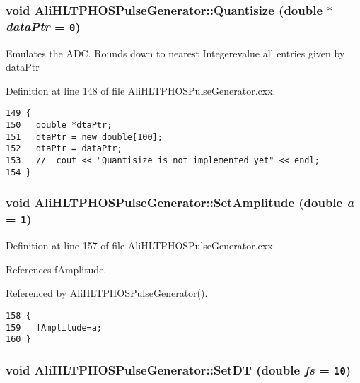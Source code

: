 \subsubsection{\setlength{\rightskip}{0pt plus 5cm}void Ali\-HLTPHOSPulse\-Generator::Quantisize (double $\ast$ {\em data\-Ptr} = {\tt 0})}\label{classAliHLTPHOSPulseGenerator_a11}


Emulates the ADC. Rounds down to nearest Integerevalue all entries given by data\-Ptr 

Definition at line 148 of file Ali\-HLTPHOSPulse\-Generator.cxx.

\footnotesize\begin{verbatim}149 {
150   double *dtaPtr;
151   dtaPtr = new double[100];
152   dtaPtr = dataPtr;
153   //  cout << "Quantisize is not implemented yet" << endl;
154 }
\end{verbatim}\normalsize 


\subsubsection{\setlength{\rightskip}{0pt plus 5cm}void Ali\-HLTPHOSPulse\-Generator::Set\-Amplitude (double {\em a} = {\tt 1})}\label{classAliHLTPHOSPulseGenerator_a12}




Definition at line 157 of file Ali\-HLTPHOSPulse\-Generator.cxx.

References f\-Amplitude.

Referenced by Ali\-HLTPHOSPulse\-Generator().

\footnotesize\begin{verbatim}158 {
159   fAmplitude=a;
160 }
\end{verbatim}\normalsize 


\subsubsection{\setlength{\rightskip}{0pt plus 5cm}void Ali\-HLTPHOSPulse\-Generator::Set\-DT (double {\em fs} = {\tt 10})}\label{classAliHLTPHOSPulseGenerator_a13}




